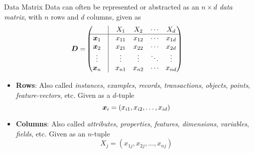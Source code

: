 \date{Chapter 1: Data Mining and Analysis}

\begin{frame}
\titlepage
\end{frame}

\begin{frame}{Data Matrix}
Data can often be represented or abstracted as an $n
\times d$ {\em data matrix},
with $n$ rows and $d$ columns, given as
\begin{align*}
        \bD = &
        \matr{%
            & \vline & X_1 & X_2 & \cdots & X_d\\
            \hline
            \bx_1 & \vline & x_{11} & x_{12} & \cdots & x_{1d}\\
            \bx_2 & \vline& x_{21} & x_{22} & \cdots & x_{2d}\\
            \vdots & \vline& \vdots & \vdots & \ddots & \vdots\\
            \bx_n & \vline& x_{n1} & x_{n2} & \cdots & x_{nd}
        }
\end{align*}
\begin{itemize}
  \item {\bf Rows}: Also called
{\em instances}, {\em examples}, {\em records}, {\em
transactions}, {\em objects}, {\em points}, {\em feature-vectors}, etc.
Given as a $d$-tuple
$${\boldsymbol x}_i = (x_{i1}, x_{i2}, \ldots, x_{id})$$
\item {\bf Columns}: Also called
{\em attributes}, {\em properties}, {\em features}, {\em dimensions}, {\em
variables}, {\em f\/{i}elds}, etc. Given as an $n$-tuple
$$X_{j} = (x_{1j}, x_{2j}, \ldots, x_{nj})$$
\end{itemize}
\end{frame}

